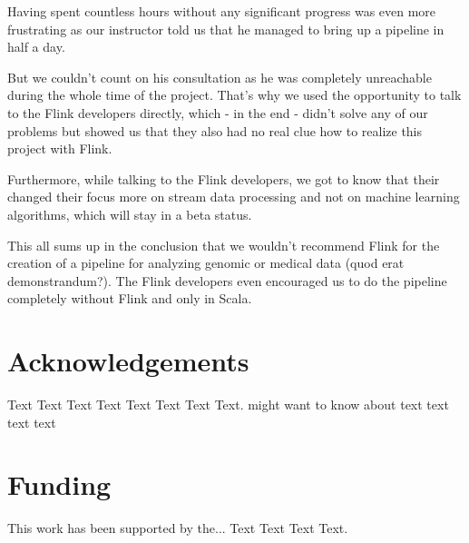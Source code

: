 \documentclass{bioinfo}
\begin{document}
Having spent countless hours without any significant progress was even more frustrating as our instructor told us that he managed to bring up a pipeline in half a day.

But we couldn't count on his consultation as he was completely unreachable during the whole time of the project. That's why we used the opportunity to talk to the Flink developers directly, which - in the end - didn't solve any of our problems but showed us that they also had no real clue how to realize this project with Flink.

Furthermore, while talking to the Flink developers, we got to know that their changed their focus more on stream data processing and not on machine learning algorithms, which will stay in a beta status.

This all sums up in the conclusion that we wouldn't recommend Flink for the creation of a pipeline for analyzing genomic or medical data (quod erat demonstrandum?). The Flink developers even encouraged us to do the pipeline completely without Flink and only in Scala.


\section*{Acknowledgements}

Text Text Text Text Text Text  Text Text.  \citealp{Boffelli03} might want to know about  text
text text text\vspace*{-12pt}

\section*{Funding}

This work has been supported by the... Text Text  Text Text.\vspace*{-12pt}

%
%
%
%
%
%
%
%
%
\end{document}
